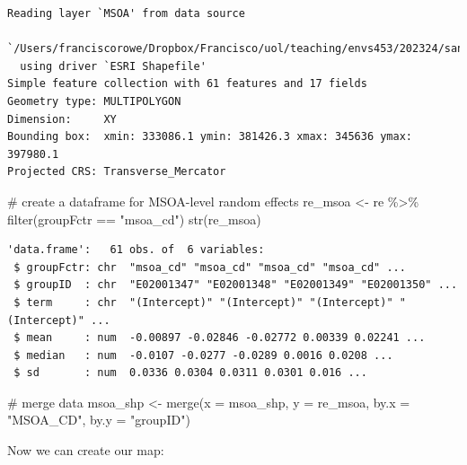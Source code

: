 \documentclass[
  letterpaper,
  DIV=11,
  numbers=noendperiod,
  oneside]{scrreprt}
\newenvironment{Shaded}{\begin{snugshade}}{\end{snugshade}}
\newcommand{\AttributeTok}[1]{\textcolor[rgb]{0.40,0.45,0.13}{#1}}
\newcommand{\CommentTok}[1]{\textcolor[rgb]{0.37,0.37,0.37}{#1}}
\newcommand{\FunctionTok}[1]{\textcolor[rgb]{0.28,0.35,0.67}{#1}}
\newcommand{\NormalTok}[1]{\textcolor[rgb]{0.00,0.23,0.31}{#1}}
\newcommand{\OtherTok}[1]{\textcolor[rgb]{0.00,0.23,0.31}{#1}}
\newcommand{\SpecialCharTok}[1]{\textcolor[rgb]{0.37,0.37,0.37}{#1}}
\newcommand{\StringTok}[1]{\textcolor[rgb]{0.13,0.47,0.30}{#1}}
\begin{document}
\begin{verbatim}
Reading layer `MSOA' from data source 
  `/Users/franciscorowe/Dropbox/Francisco/uol/teaching/envs453/202324/san/data/mlm/MSOA.shp' 
  using driver `ESRI Shapefile'
Simple feature collection with 61 features and 17 fields
Geometry type: MULTIPOLYGON
Dimension:     XY
Bounding box:  xmin: 333086.1 ymin: 381426.3 xmax: 345636 ymax: 397980.1
Projected CRS: Transverse_Mercator
\end{verbatim}

\begin{Shaded}
\begin{Highlighting}[]
\CommentTok{\# create a dataframe for MSOA{-}level random effects}
\NormalTok{re\_msoa }\OtherTok{\textless{}{-}}\NormalTok{ re }\SpecialCharTok{\%\textgreater{}\%} \FunctionTok{filter}\NormalTok{(groupFctr }\SpecialCharTok{==} \StringTok{"msoa\_cd"}\NormalTok{)}
\FunctionTok{str}\NormalTok{(re\_msoa)}
\end{Highlighting}
\end{Shaded}

\begin{verbatim}
'data.frame':   61 obs. of  6 variables:
 $ groupFctr: chr  "msoa_cd" "msoa_cd" "msoa_cd" "msoa_cd" ...
 $ groupID  : chr  "E02001347" "E02001348" "E02001349" "E02001350" ...
 $ term     : chr  "(Intercept)" "(Intercept)" "(Intercept)" "(Intercept)" ...
 $ mean     : num  -0.00897 -0.02846 -0.02772 0.00339 0.02241 ...
 $ median   : num  -0.0107 -0.0277 -0.0289 0.0016 0.0208 ...
 $ sd       : num  0.0336 0.0304 0.0311 0.0301 0.016 ...
\end{verbatim}

\begin{Shaded}
\begin{Highlighting}[]
\CommentTok{\# merge data}
\NormalTok{msoa\_shp }\OtherTok{\textless{}{-}} \FunctionTok{merge}\NormalTok{(}\AttributeTok{x =}\NormalTok{ msoa\_shp, }\AttributeTok{y =}\NormalTok{ re\_msoa, }\AttributeTok{by.x =} \StringTok{"MSOA\_CD"}\NormalTok{, }\AttributeTok{by.y =} \StringTok{"groupID"}\NormalTok{)}
\end{Highlighting}
\end{Shaded}

Now we can create our map:
\end{document}
